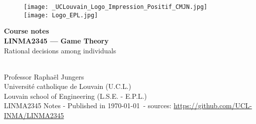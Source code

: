 \ifx \globalmark \undefined %

\else
\fi



\begin{titlepage}
\begin{center}



\vfill

\begin{figure}[!ht]
  \centering
  \texttt{[image: \_UCLouvain\_Logo\_Impression\_Positif\_CMJN.jpg]}
  \hfill
  \texttt{[image: Logo\_EPL.jpg]}
\end{figure}







{ \bfseries Course notes }
\hrulefill\\[0.5cm]
\large{\textbf{LINMA2345 --- Game Theory}\\
Rational decisions among individuals} \\
\hrulefill\\[0.5cm]

\end{center}
\vfill
\vfill

	



$\,$\\
Professor  Rapha\"el Jungers \\
$\,$\\
Universit\'e catholique de Louvain (U.C.L.)\\
Louvain school of Engineering (L.S.E. - E.P.L.)\\
$\,$\\
\tiny{LINMA2345 Notes - Published in \monthyeardate\today $\,$ - sources: \url{https://github.com/UCL-INMA/LINMA2345}}


\end{titlepage}







%






\ifx \globalmark \undefined %


	
\else

\fi

